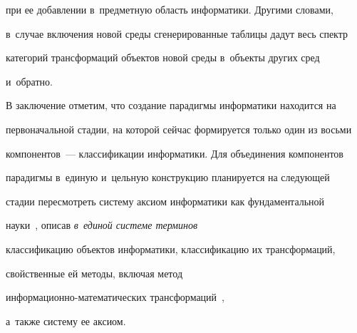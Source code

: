 при ее добавлении в~предметную область информатики. Другими словами, 

в~случае включения новой среды сгенерированные таблицы дадут весь спектр 

категорий трансформаций объектов новой среды в~объекты других сред 

и~обратно.

  

  В заключение отметим, что создание парадигмы информатики находится на 

первоначальной стадии, на которой сейчас формируется только один из восьми 

компонентов~--- классификации информатики. Для объединения компонентов 

парадигмы в~единую и~цельную конструкцию планируется на следующей 

стадии пересмотреть систему аксиом информатики как фундаментальной 

науки~\cite{20-zac}, описав \textit{в~единой сис\-те\-ме терминов} 

классификацию объектов информатики, классификацию их трансформаций, 

свойственные ей методы, включая метод  

ин\-фор\-ма\-ци\-он\-но-ма\-те\-ма\-ти\-че\-ских трансформаций~\cite{18-zac}, 

а~также сис\-те\-му ее аксиом.

  

